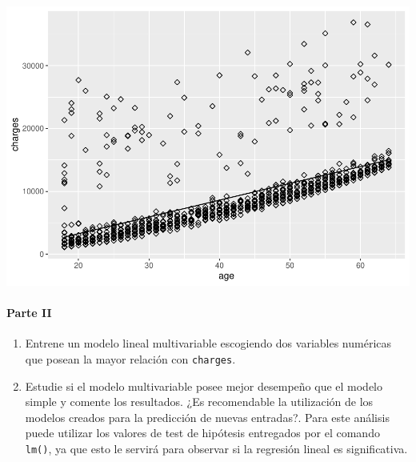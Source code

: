 \documentclass[]{article}
\newenvironment{Shaded}{\begin{snugshade}}{\end{snugshade}}
\newcommand{\AttributeTok}[1]{\textcolor[rgb]{0.77,0.63,0.00}{#1}}
\newcommand{\DecValTok}[1]{\textcolor[rgb]{0.00,0.00,0.81}{#1}}
\newcommand{\FunctionTok}[1]{\textcolor[rgb]{0.00,0.00,0.00}{#1}}
\newcommand{\NormalTok}[1]{#1}
\newcommand{\SpecialCharTok}[1]{\textcolor[rgb]{0.00,0.00,0.00}{#1}}
\providecommand{\tightlist}{%
  \setlength{\itemsep}{0pt}\setlength{\parskip}{0pt}}
\let\oldparagraph\paragraph
\renewcommand{\paragraph}[1]{\oldparagraph{#1}\mbox{}}
\begin{document}
\begin{Shaded}
\end{Shaded}

\includegraphics{Enunciado_Tarea_3_files/figure-latex/unnamed-chunk-18-1.pdf}

\hypertarget{parte-ii}{%
\paragraph{Parte II}\label{parte-ii}}

\begin{enumerate}
\def\labelenumi{\alph{enumi})}
\tightlist
\item
  Entrene un modelo lineal multivariable escogiendo dos variables
  numéricas que posean la mayor relación con \texttt{charges}.
\item
  Estudie si el modelo multivariable posee mejor desempeño que el modelo
  simple y comente los resultados. ¿Es recomendable la utilización de
  los modelos creados para la predicción de nuevas entradas?. Para este
  análisis puede utilizar los valores de test de hipótesis entregados
  por el comando \texttt{lm()}, ya que esto le servirá para observar si
  la regresión lineal es significativa.
\end{enumerate}
\end{document}

